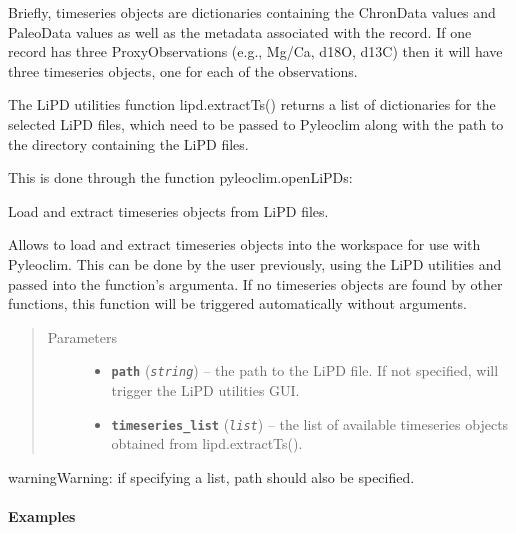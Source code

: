 \documentclass[letterpaper,10pt,english]{sphinxmanual}
\begin{document}
Briefly, timeseries objects are dictionaries containing the ChronData values and
PaleoData values as well as the metadata associated with the record. If one record
has three ProxyObservations (e.g., Mg/Ca, d18O, d13C) then it will have three timeseries
objects, one for each of the observations.

The LiPD utilities function lipd.extractTs() returns a list of dictionaries for
the selected LiPD files, which need to be passed to Pyleoclim along with the path
to the directory containing the LiPD files.

This is done through the function pyleoclim.openLiPDs:

\begin{fulllineitems}
\label{Main:pyleoclim.openLiPDs}
Load and extract timeseries objects from LiPD files.

Allows to load and extract timeseries objects into the workspace for use
with Pyleoclim. This can be done by the user previously, using the LiPD
utilities and passed into the function's argumenta. If no timeseries objects
are found by other functions, this function will be triggered automatically
without arguments.
\begin{quote}\begin{description}
\item[{Parameters}] \leavevmode\begin{itemize}
\item {} 
\textbf{\texttt{path}} (\emph{\texttt{string}}) -- the path to the LiPD file. If not specified, will
trigger the LiPD utilities GUI.

\item {} 
\textbf{\texttt{timeseries\_list}} (\emph{\texttt{list}}) -- the list of available timeseries objects
obtained from lipd.extractTs().

\end{itemize}

\end{description}\end{quote}

\begin{notice}{warning}{Warning:}
if specifying a list, path should also be specified.
\end{notice}
\paragraph{Examples}


\end{fulllineitems}
\end{document}
